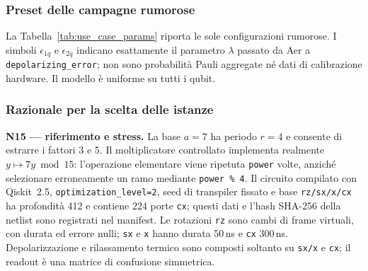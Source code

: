 \begin{onehalfspace}
\subsubsection{Preset delle campagne rumorose}

La Tabella~\ref{tab:use_case_params} riporta le sole configurazioni rumorose. I simboli $\epsilon_{1q}$ e $\epsilon_{2q}$ indicano esattamente il parametro $\lambda$ passato da Aer a \texttt{depolarizing\_error}; non sono probabilità Pauli aggregate né dati di calibrazione hardware. Il modello è uniforme su tutti i qubit.

\begin{table}[H]
\centering
{}
\caption{Preset uniformi illustrativi per le campagne rumorose N15. Non rappresentano la calibrazione di una QPU reale.}
\label{tab:use_case_params}
\end{table}

\subsubsection{Razionale per la scelta delle istanze}
\label{subsec:razionale_istanze}

\textbf{N15 --- riferimento e stress.} La base $a=7$ ha periodo $r=4$ e consente di estrarre i fattori 3 e 5. Il moltiplicatore controllato implementa realmente $y\mapsto7y\bmod15$: l'operazione elementare viene ripetuta \texttt{power} volte, anziché selezionare erroneamente un ramo mediante \texttt{power \% 4}. Il circuito compilato con Qiskit~2.5, \texttt{optimization\_level=2}, seed di transpiler fissato e base \texttt{rz/sx/x/cx} ha profondità 412 e contiene 224 porte \texttt{cx}; questi dati e l'hash SHA-256 della netlist sono registrati nel manifest. Le rotazioni \texttt{rz} sono cambi di frame virtuali, con durata ed errore nulli; \texttt{sx} e \texttt{x} hanno durata 50\,ns e \texttt{cx} 300\,ns. Depolarizzazione e rilassamento termico sono composti soltanto su \texttt{sx/x} e \texttt{cx}; il readout è una matrice di confusione simmetrica.


\end{onehalfspace}
